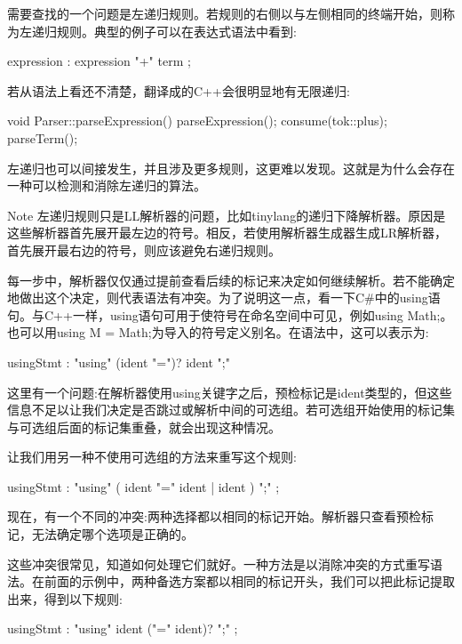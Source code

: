 需要查找的一个问题是左递归规则。若规则的右侧以与左侧相同的终端开始，则称为左递归规则。典型的例子可以在表达式语法中看到:

\begin{shell}
expression : expression "+" term ;
\end{shell}

若从语法上看还不清楚，翻译成的C++会很明显地有无限递归:

\begin{cpp}
void Parser::parseExpression() {
    parseExpression();
    consume(tok::plus);
    parseTerm();
}
\end{cpp}

左递归也可以间接发生，并且涉及更多规则，这更难以发现。这就是为什么会存在一种可以检测和消除左递归的算法。

\begin{myNotic}{Note}
左递归规则只是LL解析器的问题，比如tinylang的递归下降解析器。原因是这些解析器首先展开最左边的符号。相反，若使用解析器生成器生成LR解析器，首先展开最右边的符号，则应该避免右递归规则。
\end{myNotic}

每一步中，解析器仅仅通过提前查看后续的标记来决定如何继续解析。若不能确定地做出这个决定，则代表语法有冲突。为了说明这一点，看一下C\#中的using语句。与C++一样，using语句可用于使符号在命名空间中可见，例如using Math;。也可以用using M = Math;为导入的符号定义别名。在语法中，这可以表示为:

\begin{shell}
usingStmt : "using" (ident "=")? ident ";"
\end{shell}

这里有一个问题:在解析器使用using关键字之后，预检标记是ident类型的，但这些信息不足以让我们决定是否跳过或解析中间的可选组。若可选组开始使用的标记集与可选组后面的标记集重叠，就会出现这种情况。

让我们用另一种不使用可选组的方法来重写这个规则:

\begin{shell}
usingStmt : "using" ( ident "=" ident | ident ) ";" ;
\end{shell}

现在，有一个不同的冲突:两种选择都以相同的标记开始。解析器只查看预检标记，无法确定哪个选项是正确的。

这些冲突很常见，知道如何处理它们就好。一种方法是以消除冲突的方式重写语法。在前面的示例中，两种备选方案都以相同的标记开头，我们可以把此标记提取出来，得到以下规则:

\begin{shell}
usingStmt : "using" ident ("=" ident)? ";" ;
\end{shell}


